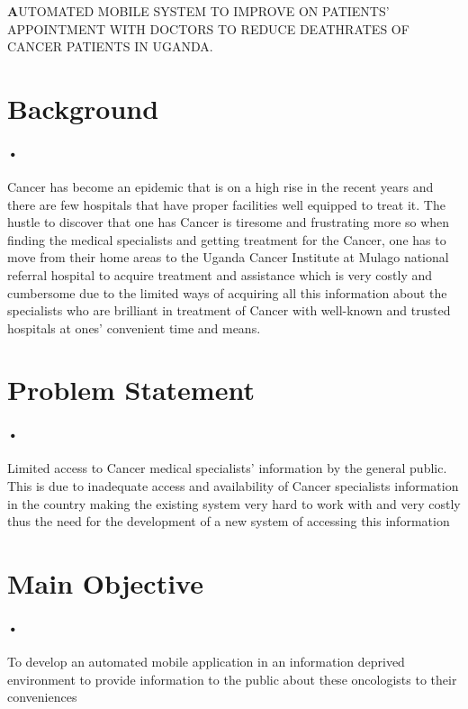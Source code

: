 \documentclass[12pt]{article}
\begin{document}
\newpage
\title{ }\textbf AUTOMATED MOBILE SYSTEM TO IMPROVE ON PATIENTS’ APPOINTMENT WITH DOCTORS TO REDUCE DEATHRATES OF CANCER PATIENTS IN UGANDA.


\section{Background}

\paragraph{•}Cancer has become an epidemic that is on a high rise in the recent years and there are few hospitals that have proper facilities well equipped to treat it. The hustle to discover that one has Cancer is tiresome and frustrating more so when finding the medical specialists and getting treatment for the Cancer, one has to move from their home areas to the Uganda Cancer Institute at Mulago national referral hospital to acquire treatment and assistance which is very costly and cumbersome due to the limited ways of acquiring all this information about the specialists who are brilliant in treatment of Cancer with well-known and trusted hospitals at ones’ convenient time and means.  

\section{Problem Statement}

\paragraph{•}Limited access to Cancer medical specialists’ information by the general public. This is due to inadequate access and availability of Cancer specialists information in the country making the existing system very hard to work with and very costly thus the need for the development of a new system of accessing this information

\section{Main Objective}

\paragraph{•}To develop an automated mobile application in an information deprived environment to provide information to the public about these oncologists to their conveniences
\end{document}
